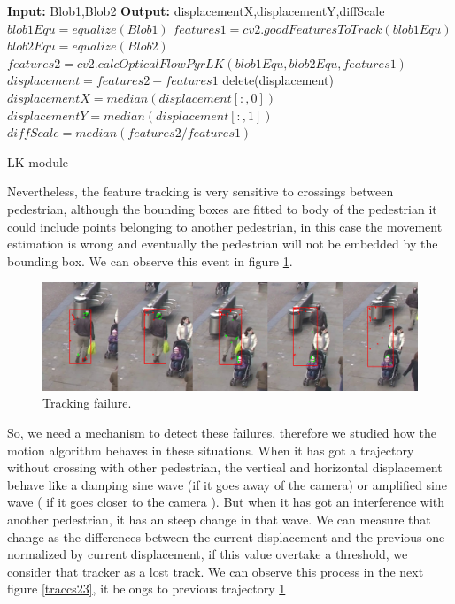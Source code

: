 \begin{algorithm}
\begin{algorithmic}[1]
\State \textbf{Input:} Blob1,Blob2 
\State \textbf{Output:} displacementX,displacementY,diffScale
\State $blob1Equ = equalize(Blob1)$
\State $features1 = cv2.goodFeaturesToTrack(blob1Equ)$
\State $blob2Equ = equalize(Blob2)$
\State $features2 = cv2.calcOpticalFlowPyrLK(blob1Equ,blob2Equ,features1)$
\State $displacement = features2-features1 $
\State delete(displacement)
\EndIf
\State $displacementX = median(displacement[:,0]) $
\State $displacementY = median(displacement[:,1]) $
\State $diffScale = median(features2/features1) $
\end{algorithmic}
\caption{LK module}\label{trackingModule}
\end{algorithm}


\vspace{2cm}


Nevertheless, the feature tracking is very sensitive to crossings between pedestrian, although the bounding boxes are fitted to body of the pedestrian it could include points belonging to another pedestrian, in this case the movement estimation is wrong and eventually the pedestrian will not be embedded by the bounding box. We can observe this event in figure \ref{traccs}.


\begin{figure}[H]
\centering         
\includegraphics[width=0.9\linewidth]{velocidadas/mateuPont.png}
\caption{Tracking failure.} \label{traccs}
\end{figure}


So, we need a mechanism to detect these failures, therefore we studied how the motion algorithm behaves in these situations. When it has got a trajectory without crossing with other pedestrian, the vertical and horizontal displacement behave like a damping sine wave (if it goes away of the camera)  or amplified sine wave ( if it goes closer to the camera ). But when it has got an interference with another pedestrian, it has an steep change in that wave. We can measure that change as the differences between the current displacement and the previous one normalized by current displacement, if this value overtake a threshold, we consider that tracker as a lost track. We can observe this process in the next figure \ref{traccs23}, it belongs to previous trajectory \ref{traccs} 


